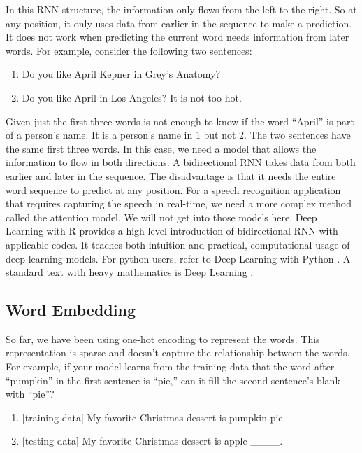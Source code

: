 \documentclass[
  12pt,
]{krantz}
\providecommand{\tightlist}{%
  \setlength{\itemsep}{0pt}\setlength{\parskip}{0pt}}
\begin{document}
In this RNN structure, the information only flows from the left to the right. So at any position, it only uses data from earlier in the sequence to make a prediction. It does not work when predicting the current word needs information from later words. For example, consider the following two sentences:

\begin{enumerate}
\def\labelenumi{\arabic{enumi}.}
\tightlist
\item
  Do you like April Kepner in Grey's Anatomy?
\item
  Do you like April in Los Angeles? It is not too hot.
\end{enumerate}

Given just the first three words is not enough to know if the word ``April'' is part of a person's name. It is a person's name in 1 but not 2. The two sentences have the same first three words. In this case, we need a model that allows the information to flow in both directions. A bidirectional RNN takes data from both earlier and later in the sequence. The disadvantage is that it needs the entire word sequence to predict at any position. For a speech recognition application that requires capturing the speech in real-time, we need a more complex method called the attention model. We will not get into those models here. Deep Learning with R \citep{deeplearningr18} provides a high-level introduction of bidirectional RNN with applicable codes. It teaches both intuition and practical, computational usage of deep learning models. For python users, refer to Deep Learning with Python \citep{deeplearningpy17}. A standard text with heavy mathematics is Deep Learning \citep{Goodfellow-et-al-2016}.

\hypertarget{embedding}{%
\subsection{Word Embedding}\label{embedding}}

So far, we have been using one-hot encoding to represent the words. This representation is sparse and doesn't capture the relationship between the words. For example, if your model learns from the training data that the word after ``pumpkin'' in the first sentence is ``pie,'' can it fill the second sentence's blank with ``pie''?

\begin{enumerate}
\def\labelenumi{\arabic{enumi}.}
\tightlist
\item
  {[}training data{]} My favorite Christmas dessert is pumpkin pie.
\item
  {[}testing data{]} My favorite Christmas dessert is apple \_\_\_\_.
\end{enumerate}
\end{document}
